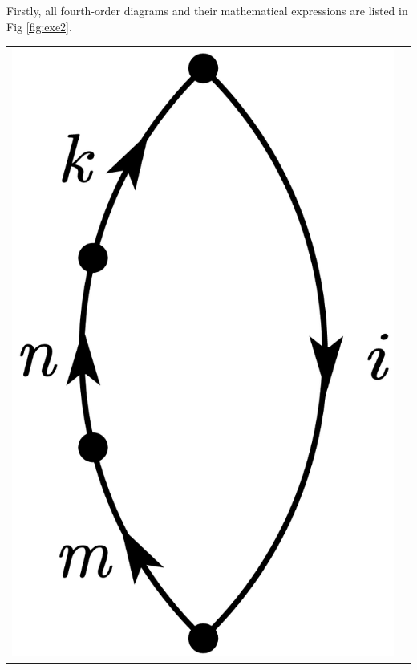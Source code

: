 \documentclass[a4paper]{book}
\newcounter{solution}[chapter]
\newcommand\Figref[1]{Fig \ref{#1}}
\begin{document}
	\begin{solution}
	
	Firstly, all fourth-order diagrams and their mathematical expressions are listed in \Figref{fig:exe2}.
	
	\begin{center}
	\begin{tabular}{cc}
	
		\begin{minipage}{0.49\linewidth}
		\centering
		\includegraphics[scale=1.0,trim=0 -4 0 -4]{./pictures/6.02/1.png}
		\captionof*{figure}{$(-1)^{1+1} { \sum_{kmn} }^\prime \frac{ V_{ki} V_{nk} V_{mn} V_{im} }{ ( E^{(0)}_i - E^{(0)}_k ) ( E^{(0)}_i - E^{(0)}_n ) ( E^{(0)}_i - E^{(0)}_m ) }$}
		\end{minipage} &
		

\end{tabular}
\end{center}
\end{solution}
\end{document}
